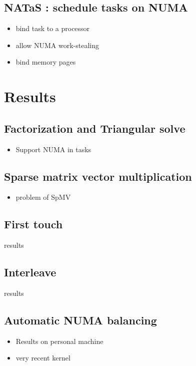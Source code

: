 \documentclass[oneside,12t]{classes/Thesis}
\begin{document}
\subsection{NATaS : schedule tasks on NUMA}
  \begin{itemize}
    \item bind task to a processor
    \item allow NUMA work-stealing
    \item bind memory pages
  \end{itemize}


\section{Results}
\subsection{Factorization and Triangular solve}
  \begin{itemize}
    \item Support NUMA in tasks
  \end{itemize}
\subsection{Sparse matrix vector multiplication}
  \begin{itemize}
    \item problem of SpMV
  \end{itemize}
\subsection{First touch}
results
\subsection{Interleave}
results
\subsection{Automatic NUMA balancing}
  \begin{itemize}
    \item Results on personal machine
    \item very recent kernel
  \end{itemize}
\end{document}
